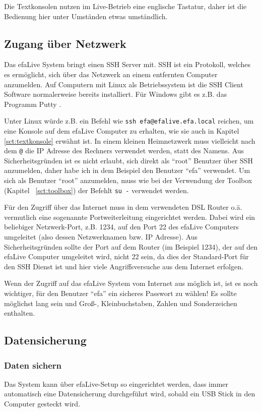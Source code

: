 \documentclass[a4paper,12pt,twoside]{article}
\begin{document}
Die Textkonsolen nutzen im Live-Betrieb eine englische Tastatur, daher
ist die Bedienung hier unter Umständen etwas umständlich.


\subsection{Zugang über Netzwerk}
\label{sct:zugang_netzwerk}
Das efaLive System bringt einen SSH Server mit. SSH ist ein Protokoll,
welches es ermöglicht, sich über das Netzwerk an einem entfernten
Computer anzumelden. Auf Computern mit Linux als Betriebssystem ist die
SSH Client Software normalerweise bereits installiert. Für Windows gibt
es z.B. das Programm Putty \cite{PUT1}.

Unter Linux würde z.B. ein Befehl wie \texttt{ssh efa@efalive.efa.local} 
reichen, um eine Konsole auf dem
efaLive Computer zu erhalten, wie sie auch in Kapitel
\ref{sct:textkonsole} erwähnt ist. In einem kleinen Heimnetzwerk
muss vielleicht nach dem \texttt{@} die IP Adresse
des Rechners verwendet werden, statt des Namens. Aus Sicherheitsgründen
ist es nicht erlaubt, sich direkt als
"`root"' Benutzer über SSH anzumelden, daher
habe ich in dem Beispiel den Benutzer "`efa"'
verwendet. Um sich als Benutzer "`root"'
anzumelden, muss wie bei der Verwendung der Toolbox (Kapitel
~\ref{sct:toolbox}) der Befehlt \texttt{su -} verwendet werden.

Für den Zugriff über das Internet muss in dem verwendeten DSL Router
o.ä. vermutlich eine sogenannte Portweiterleitung eingerichtet werden.
Dabei wird ein beliebiger Netzwerk-Port, z.B. 1234, auf den Port 22 des
efaLive Computers umgeleitet (also dessen Netzwerknamen bzw. IP
Adresse). Aus Sicherheitsgründen sollte der Port auf dem Router (im
Beispiel 1234), der auf den efaLive Computer umgeleitet wird, nicht 22
sein, da dies der Standard-Port für den SSH Dienst ist und hier viele
Angriffsversuche aus dem Internet erfolgen.

Wenn der Zugriff auf das efaLive System vom Internet aus möglich ist,
ist es noch wichtiger, für den Benutzer
"`efa"' ein sicheres Passwort zu wählen! Es
sollte möglichst lang sein und Groß-, Kleinbuchstaben, Zahlen und
Sonderzeichen enthalten.


\subsection{Datensicherung}
\label{sct:datensicherung}
\subsubsection{Daten sichern}
\label{sct:daten_sichern}
Das System kann über efaLive-Setup
so eingerichtet werden, dass immer automatisch eine Datensicherung
durchgeführt wird, sobald ein USB Stick in den Computer gesteckt wird. 
\end{document}
